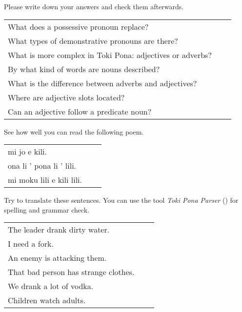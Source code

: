 Please write down your answers and check them afterwards.

\begin{supertabular}{p{5,5cm}|ll}
    What does a possessive pronoun replace?                   &  & \\ %
    What types of demonstrative pronouns are there?           &  & \\ %
    What is more complex in Toki Pona: adjectives or adverbs? &  & \\ %
    By what kind of words are nouns described?                &  & \\ %
    What is the difference between adverbs and adjectives?    &  & \\ %
    Where are adjective slots located?                        &  & \\ %
    Can an adjective follow a predicate noun?                 &  & \\ %
\end{supertabular}

See how well you can read the following poem.

\begin{supertabular}{p{5,5cm}|ll}
    mi jo e kili.             &  & \\ %
    ona li ' pona li ' lili.  &  & \\ %
    mi moku lili e kili lili. &  & \\ %
\end{supertabular}

Try to translate these sentences.
You can use the tool \textit{Toki Pona Parser} (\cite{www:rowa:02}) for spelling and grammar check.

\begin{supertabular}{p{5,5cm}|ll}
    The leader drank dirty water.        &  & \\ %
    I need a fork.                       &  & \\ %
    An enemy is attacking them.          &  & \\ %
    That bad person has strange clothes. &  & \\  %
    We drank a lot of vodka.             &  & \\ %
    Children watch adults.               &  & \\ %
\end{supertabular}

